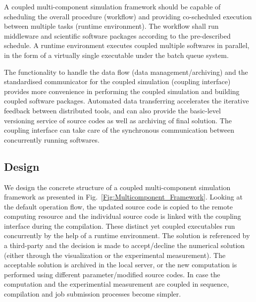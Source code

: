 \documentclass[10pt,conference]{IEEEtran}
\begin{document}
A coupled multi-component simulation framework should be capable of 
scheduling the overall procedure (workflow) and providing co-scheduled 
execution between multiple tasks (runtime environment). The workflow 
shall run middleware and scientific software packages according to the 
pre-described schedule. A runtime environment executes coupled multiple 
softwares in parallel, in the form of a virtually single executable 
under the batch queue system.

The functionality to handle the data flow (data management/archiving) 
and the standardised communicator for the coupled simulation (coupling 
interface) provides more convenience in performing the coupled 
simulation and building coupled software packages. Automated data 
transferring accelerates the iterative feedback between distributed 
tools, and can also provide the basic-level versioning service of 
source codes as well as archiving of final solution. The coupling 
interface can take care of the synchronous communication between 
concurrently running softwares.


\subsection{Design}
We design the concrete structure of a coupled multi-component 
simulation framework as presented in Fig.~\ref{Fig:Multicomponent_Framework}.
Looking at the default operation flow, the updated source code is copied to
the remote computing resource and the individual source code is linked with
the coupling interface during the compilation. These distinct yet coupled
executables run concurrently by the help of a runtime environment. The solution
is referenced by a third-party and the decision is made to accept/decline
the numerical solution (either through the visualization or 
the experimental measurement). The acceptable solution is archived 
in the local server, or the new computation is performed using different
parameter/modified source codes. In case the computation and 
the experimential measurement are coupled in sequence, 
compilation and job submission processes become simpler.
\end{document}
